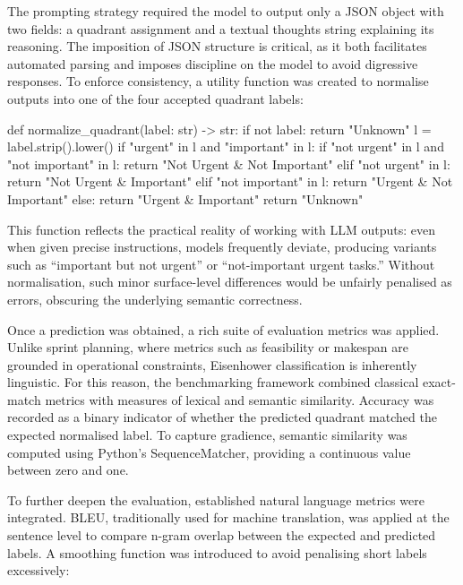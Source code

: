 \documentclass{report}
\begin{document}
The prompting strategy required the model to output only a JSON object with two fields: a quadrant assignment and a textual thoughts string explaining its reasoning. 
The imposition of JSON structure is critical, as it both facilitates automated parsing and imposes discipline on the model to avoid digressive responses. 
To enforce consistency, a utility function was created to normalise outputs into one of the four accepted quadrant labels:

\begin{python}
def normalize_quadrant(label: str) -> str:
    if not label:
        return "Unknown"
    l = label.strip().lower()
    if "urgent" in l and "important" in l:
        if "not urgent" in l and "not important" in l:
            return "Not Urgent & Not Important"
        elif "not urgent" in l:
            return "Not Urgent & Important"
        elif "not important" in l:
            return "Urgent & Not Important"
        else:
            return "Urgent & Important"
    return "Unknown"

\end{python}

This function reflects the practical reality of working with LLM outputs: even when given precise instructions, models frequently deviate, producing variants such as “important but not urgent” or “not-important urgent tasks.” 
Without normalisation, such minor surface-level differences would be unfairly penalised as errors, obscuring the underlying semantic correctness.

Once a prediction was obtained, a rich suite of evaluation metrics was applied. 
Unlike sprint planning, where metrics such as feasibility or makespan are grounded in operational constraints, Eisenhower classification is inherently linguistic. 
For this reason, the benchmarking framework combined classical exact-match metrics with measures of lexical and semantic similarity. 
Accuracy was recorded as a binary indicator of whether the predicted quadrant matched the expected normalised label. 
To capture gradience, semantic similarity was computed using Python’s SequenceMatcher, providing a continuous value between zero and one.

To further deepen the evaluation, established natural language metrics were integrated. 
BLEU, traditionally used for machine translation, was applied at the sentence level to compare n-gram overlap between the expected and predicted labels. 
A smoothing function was introduced to avoid penalising short labels excessively:
\end{document}

